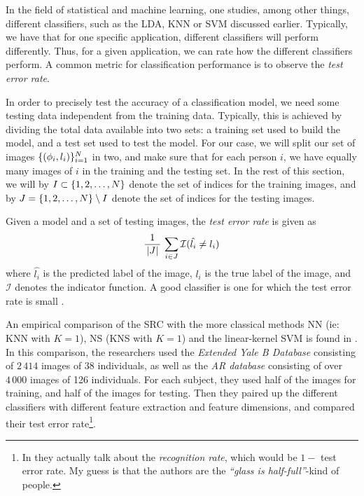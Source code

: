 In the field of statistical and machine learning, one studies, among other things, different classifiers, such as the LDA, KNN or SVM discussed earlier. Typically, we have that for one specific application, different classifiers will perform differently. Thus, for a given application, we can rate how the different classifiers perform. A common metric for classification performance is to observe the \textit{test error rate}.

In order to precisely test the accuracy of a classification model, we need some testing data independent from the training data. Typically, this is achieved by dividing the total data available into two sets: a training set used to build the model, and a test set used to test the model. For our case, we will split our set of images $ \{(\phi_{i}, l_{i})\}_{i=1}^{N} $ in two, and make sure that for each person $ i $, we have equally many images of $ i $ in the training and the testing set. In the rest of this section, we will by $ I \subset \{1, 2, \ldots, N\} $ denote the set of indices for the training images, and by $ J = \{1, 2, \ldots, N\} \setminus I $ denote the set of indices for the testing images. 

Given a model and a set of testing images, the \textit{test error rate} is given as
\begin{equation}
	\label{eq:errorrate}
	\dfrac{1}{\,\left|J\right|\,} \, \sum_{i\in J} \mathcal{I}(\hat{l_{i}} \neq l_{i})
\end{equation}
where $ \hat{l_{i}} $ is the predicted label of the image, $ l_{i} $ is the true label of the image, and $ \mathcal{I} $ denotes the indicator function. A good classifier is one for which the test error rate is small \cite[Section~2.2]{ISLR}.

An empirical comparison of the SRC with the more classical methods NN (ie: KNN with $ K = 1 $), NS (KNS with $ K=1 $) and the linear-kernel SVM is found in \cite{wright09facerecog}. In this comparison, the researchers used the \textit{Extended Yale B Database} consisting of $ 2\,414 $ images of $ 38 $ individuals, as well as the \textit{AR database} consisting of over $ 4\,000 $ images of 126 individuals. For each subject, they used half of the images for training, and half of the images for testing. Then they paired up the different classifiers with different feature extraction and feature dimensions, and compared their test error rate\footnote{In \cite{wright09facerecog} they actually talk about the \textit{recognition rate}, which would be $ 1 - $ test error rate. My guess is that the authors are the \textit{``glass is half-full''}-kind of people.}.



